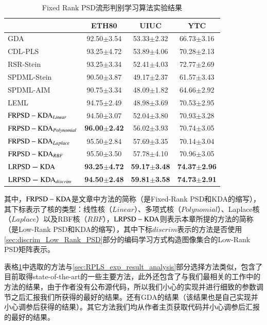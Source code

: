 \begin{table}[htb]
	\centering
	\caption{Fixed Rank PSD流形判别学习算法实验结果}
	\begin{tabular*}{\linewidth}{@{\extracolsep{\fill}}|l|ccc|}\hline
		\diagbox{方法}{数据集} &ETH80 &UIUC &YTC \\ \hline
		GDA\cite{Subspace_GDA} &92.50$\pm$3.54	&53.33$\pm$2.32 &66.73$\pm$3.16 \\ \hline
		CDL-PLS\cite{Statistics_CDL} &93.25$\pm$4.72 &53.89$\pm$4.06 &70.28$\pm$2.13 \\ \hline
		RSR-Stein\cite{Dictionary_RSR} &93.25$\pm$3.34 &52.41$\pm$4.03 &72.77$\pm$2.69  \\ \hline
		SPDML-Stein\cite{Statistics_SPDML} &90.50$\pm$3.87 &49.17$\pm$2.37 &61.57$\pm$3.43  \\ \hline
		SPDML-AIM\cite{Statistics_SPDML} &90.75$\pm$3.34 &48.09$\pm$1.82 &64.66$\pm$2.92  \\ \hline
		LEML\cite{Statistics_LEML}&94.75$\pm$2.49 &48.98$\pm$3.69 &70.53$\pm$2.95  \\ \hline
		${\rm FRPSD-KDA}_{Linear}$\cite{PSD_WACV}&94.50$\pm$3.07	&52.04$\pm$3.80	&70.93$\pm$3.28  \\ \hline
		${\rm FRPSD-KDA}_{Polynomial}$\cite{PSD_WACV}&\textbf{96.00$\pm$2.42}	&56.02$\pm$3.93 &70.74$\pm$3.05  \\ \hline
		${\rm FRPSD-KDA}_{Laplace}$\cite{PSD_WACV}&95.50$\pm$2.84 &57.69$\pm$3.35 &70.14$\pm$3.04  \\ \hline
		${\rm FRPSD-KDA}_{RBF}$\cite{PSD_WACV}&95.50$\pm$3.50 &57.78$\pm$4.10 &70.96$\pm$3.05\\ \hline
		${\rm \bm{LRPSD-KDA}}$ &\textbf{93.25$\pm$4.72} &\textbf{59.17$\pm$3.48} &\textbf{74.37$\pm$2.96}  \\ \hline
		${\rm \bm{LRPSD-KDA}}_{discrim}$ &\textbf{94.50$\pm$2.48} &\textbf{59.81$\pm$3.58} &\textbf{74.73$\pm$2.91}  \\ \hline
	\end{tabular*}
	\label{tab:LRPSD_experiment}
\end{table}
其中，${\rm FRPSD-KDA}$是文章\cite{PSD_WACV}中方法的简称（是Fixed-Rank PSD和KDA的缩写），其下标表示了核的类型：线性核（$Linear$）、多项式核（$Polynomial$）、Laplace核（$Laplace$）以及RBF核（$RBF$），${\rm LRPSD-KDA}$则表示本章所提的方法的简称（是Low-Rank PSD和KDA的缩写），其中下标$discrim$表示的方法是否使用\ref{sec:discrim_Low_Rank_PSD}部分的编码学习方式构造图像集合的Low-Rank PSD矩阵表示。

表格\ref{tab:LRPSD_experiment}中选取的方法与\ref{sec:RPLS_exp_result_analysis}部分选择方法类似，包含了目前取得state-of-the-art的一些主要方法，此外还包含了与我们最相关的工作\cite{PSD_WACV}中的方法的结果，由于作者没有公布源代码，所以我们小心的实现并进行细致的参数调节之后汇报我们所获得的最好的结果。还有GDA\cite{Subspace_GDA}的结果（该结果也是自己实现并小心调参后获得的结果）。其它方法我们均从作者主页获取代码并小心调参后汇报的最好的结果。

